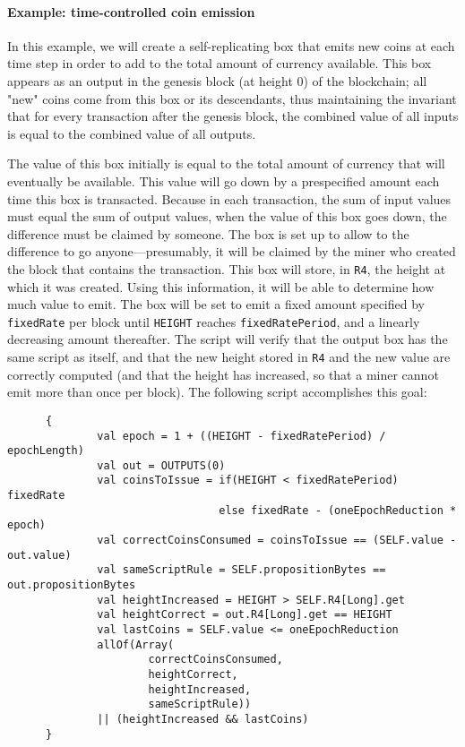 \documentclass[11pt]{article}
\begin{document}
\paragraph{Example: time-controlled coin emission}
In this example, we will create a self-replicating box that emits new coins at each time step in order to add to the total amount of currency available. This box appears as an output in the genesis block (at height 0) of the blockchain; all "new" coins come from this box or its descendants, thus maintaining the invariant that for every transaction after the genesis block, the combined value of all inputs  is equal to the combined value of all outputs.

The value of this box initially is equal to the total amount of currency that will eventually be available. This value will go down by a prespecified amount each time this box is transacted. Because in each transaction, the sum of input values must equal the sum of output values, when the value of this box goes down, the difference must be claimed by someone. The box is set up to allow to the difference to go anyone---presumably, it will be claimed by the miner who created the block that contains the transaction. This box will store, in \texttt{R4}, the height at which it was created. Using this information, it will be able to determine how much value to emit. The box will be set to emit 
a fixed amount specified by \texttt{fixedRate} per block until \texttt{HEIGHT} reaches \texttt{fixedRatePeriod}, and a linearly decreasing amount thereafter. The script will verify that the output box has the same script as itself, and that the new height stored in \texttt{R4} and the new value are correctly computed (and that the height has increased, so that a miner cannot emit more than once per block). The following script accomplishes this goal:
\begin{verbatim}
      {
              val epoch = 1 + ((HEIGHT - fixedRatePeriod) / epochLength)
              val out = OUTPUTS(0)
              val coinsToIssue = if(HEIGHT < fixedRatePeriod) fixedRate 
                                 else fixedRate - (oneEpochReduction * epoch)
              val correctCoinsConsumed = coinsToIssue == (SELF.value - out.value)
              val sameScriptRule = SELF.propositionBytes == out.propositionBytes
              val heightIncreased = HEIGHT > SELF.R4[Long].get
              val heightCorrect = out.R4[Long].get == HEIGHT
              val lastCoins = SELF.value <= oneEpochReduction
              allOf(Array(
                      correctCoinsConsumed, 
                      heightCorrect, 
                      heightIncreased, 
                      sameScriptRule)) 
              || (heightIncreased && lastCoins)
      }
\end{verbatim}
\end{document}

